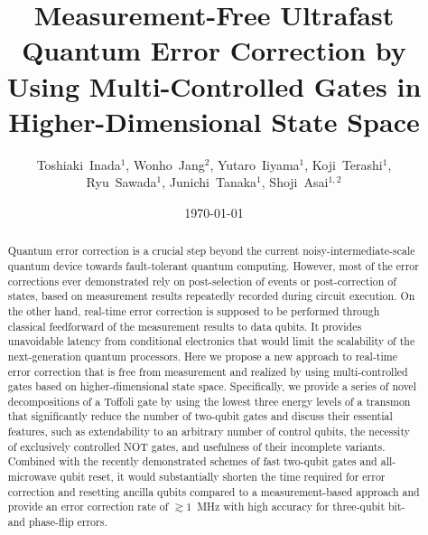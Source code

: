 \documentclass[aps,prl,twocolumn,groupedaddress,superscriptaddress]{revtex4}
\begin{document}
\title{Measurement-Free Ultrafast Quantum Error Correction by Using Multi-Controlled Gates in Higher-Dimensional State Space}

\author{Toshiaki~Inada$^1$, Wonho~Jang$^2$, Yutaro~Iiyama$^1$, Koji~Terashi$^1$,\\ Ryu~Sawada$^1$, Junichi~Tanaka$^1$, Shoji~Asai$^{1,2}$}

\date{\today}

\begin{abstract}
Quantum error correction is a crucial step beyond the current noisy-intermediate-scale quantum device towards fault-tolerant quantum computing.
However, most of the error corrections ever demonstrated rely on post-selection of events or post-correction of states, based on measurement results repeatedly recorded during circuit execution.
On the other hand, real-time error correction is supposed to be performed through classical feedforward of the measurement results to data qubits.
It provides unavoidable latency from conditional electronics that would limit the scalability of the next-generation quantum processors.
Here we propose a new approach to real-time error correction that is free from measurement and realized by using multi-controlled gates based on higher-dimensional state space.
Specifically, we provide a series of novel decompositions of a Toffoli gate by using the lowest three energy levels of a transmon that significantly reduce the number of two-qubit gates and discuss their essential features, such as extendability to an arbitrary number of control qubits, the necessity of exclusively controlled NOT gates, and usefulness of their incomplete variants.
Combined with the recently demonstrated schemes of fast two-qubit gates and all-microwave qubit reset, it would substantially shorten the time required for error correction and resetting ancilla qubits compared to a measurement-based approach and provide an error correction rate of $\gtrsim1$~MHz with high accuracy for three-qubit bit- and phase-flip errors.
\end{abstract}

\pacs{}
\maketitle
\end{document}
